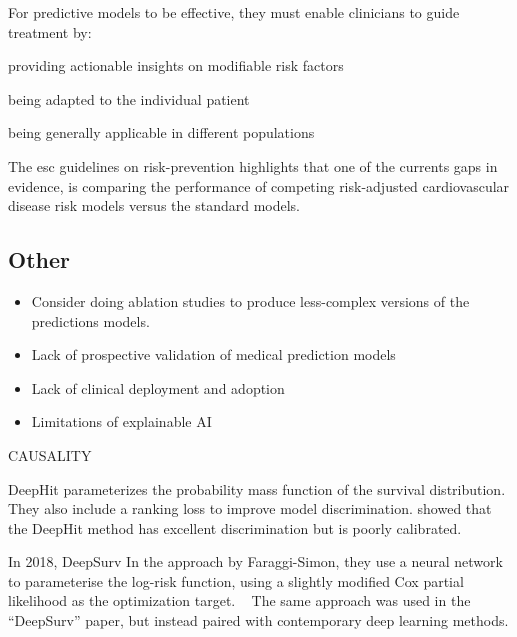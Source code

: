 For predictive models to be effective,
they must enable clinicians to guide treatment by:
%
\begin{enumerate*}
    \item providing actionable insights on modifiable risk factors
    \item being adapted to the individual patient
    \item being generally applicable in different populations
\end{enumerate*}



The esc guidelines on risk-prevention highlights 
that one of the currents gaps in evidence,
is comparing the performance of competing risk-adjusted 
cardiovascular disease risk models versus the standard models.
~\autocite{visseren20212021}

\subsection{Other}


\begin{itemize}
    \item Consider doing ablation studies to produce less-complex versions
        of the predictions models.
    \item Lack of prospective validation of medical prediction models
    \item Lack of clinical deployment and adoption 
    \item Limitations of explainable AI
\end{itemize}

CAUSALITY




DeepHit parameterizes the probability mass function 
of the survival distribution.
They also include a ranking loss to improve model discrimination.
\citeauthor{kvammeContinuous2021} showed that the DeepHit method
has excellent discrimination but is poorly calibrated.



In 2018, DeepSurv 
In the approach by Faraggi-Simon, they use a neural network to 
parameterise the log-risk function, using a slightly modified Cox partial 
likelihood as the optimization target.
~\autocite{faraggiNeural1995}
The same approach was used in the \enquote{DeepSurv} paper,
but instead paired with contemporary deep learning methods.
~\autocite{katzmanDeepSurv2018a}


